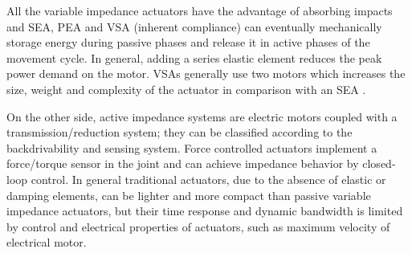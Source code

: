 \documentclass[journal]{IEEEtran}
\begin{document}
\par All the variable impedance actuators have the advantage of absorbing impacts and SEA, PEA and VSA (inherent compliance) can eventually mechanically storage energy during passive phases and release it in active phases of the movement cycle. In general, adding a series elastic element reduces the peak power demand on the motor.  VSAs generally use two motors which increases the size, weight and complexity of the actuator in comparison with an SEA \cite{wolf2011dlr}.

\par On the other side, active impedance systems are electric motors coupled with a transmission/reduction system; they can be classified
according to the backdrivability and sensing system. Force controlled actuators implement a force/torque sensor
in the joint and can achieve impedance behavior by closed-loop control.
In general traditional actuators, due to the absence of elastic or damping elements, can be lighter and more compact
than passive variable impedance actuators, but their time response and dynamic bandwidth is limited by control and electrical properties of actuators, such as maximum velocity of electrical motor.
%
%
\end{document}
